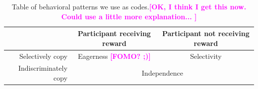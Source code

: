 \documentclass[12pt,letterpaper]{article}
\newcommand{\andrew}[1]{\textcolor{magenta}{\bf [#1]}}
\begin{document}





\begin{table}[]
\begin{tabular}{r|c|c}
                      & Participant receiving reward & Participant not receiving reward  \\ \hline
Selectively copy  & Eagerness \andrew{FOMO? ;)}                  & \multicolumn{1}{c|}{Selectivity} \\ \hline
Indiscriminately copy &  \multicolumn{2}{c|}{Independence}  \\ \cline{1-3} 
\end{tabular}
\caption{Table of behavioral patterns we use as codes.\andrew{OK, I think I get this now.  Could use a little more explanation... }}
\label{tab:qual_scoring_defs}
\end{table}
\end{document}
